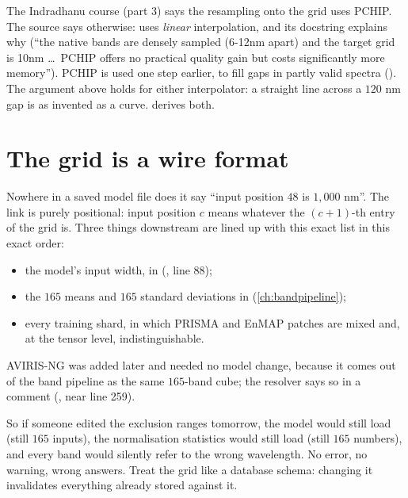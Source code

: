 \begin{sourcenote}
The Indradhanu course (part 3) says the resampling onto the grid uses PCHIP. The source says
otherwise:  uses \emph{linear}
interpolation, and its docstring explains why (``the native bands are densely sampled (6-12nm
apart) and the target grid is 10nm \dots\ PCHIP offers no practical quality gain but costs
significantly more memory''). PCHIP is used one step earlier, to fill gaps in partly valid
spectra (). The argument above holds for either interpolator: a
straight line across a $120$ nm gap is as invented as a curve.  derives both.
\end{sourcenote}

\section{The grid is a wire format}\label{sec:sensors:wire}

Nowhere in a saved model file does it say ``input position $48$ is $1{,}000$ nm''. The link is
purely positional: input position $c$ means whatever the $(c+1)$-th entry of the grid is. Three
things downstream are lined up with this exact list in this exact order:
\begin{itemize}
\item the model's input width,  in
 (, line 88);
\item the $165$ means and $165$ standard deviations in 
(\cref{ch:bandpipeline});
\item every training shard, in which PRISMA and EnMAP patches are mixed and, at the tensor level,
indistinguishable.
\end{itemize}
AVIRIS-NG was added later and needed no model change, because it comes out of the band pipeline as
the same $165$-band cube; the resolver says so in a comment
(, near line 259).

So if someone edited the exclusion ranges tomorrow, the model would still load (still $165$
inputs), the normalisation statistics would still load (still $165$ numbers), and every band would
silently refer to the wrong wavelength. No error, no warning, wrong answers. Treat the grid like a
database schema: changing it invalidates everything already stored against it.

